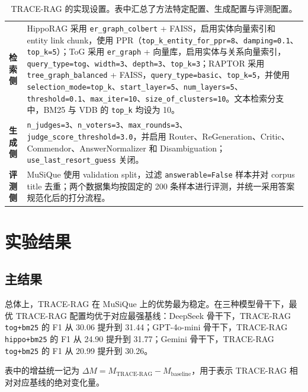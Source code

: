 ﻿\documentclass[UTF8,11pt,twocolumn]{ctexart}
\begin{document}
\begin{table}[t]
\centering
\small
\begin{tabularx}{\columnwidth}{@{}>{\raggedright\arraybackslash\bfseries}p{1.45cm}>{\raggedright\arraybackslash}X@{}}
\toprule
检索侧 & HippoRAG 采用 \texttt{er\_graph\_colbert} + FAISS，启用实体向量索引和 entity link chunk，使用 PPR（\texttt{top\_k\_entity\_for\_ppr=8}、\texttt{damping=0.1}、\texttt{top\_k=5}）；ToG 采用 \texttt{er\_graph} + 向量库，启用实体与关系向量索引，\texttt{query\_type=tog}、\texttt{width=3}、\texttt{depth=3}、\texttt{top\_k=3}；RAPTOR 采用 \texttt{tree\_graph\_balanced} + FAISS，\texttt{query\_type=basic}、\texttt{top\_k=5}，并使用 \texttt{selection\_mode=top\_k}、\texttt{start\_layer=5}、\texttt{num\_layers=5}、\texttt{threshold=0.1}、\texttt{max\_iter=10}、\texttt{size\_of\_clusters=10}。文本检索分支中，BM25 与 VDB 的 \texttt{top\_k} 均设为 10。 \\
生成侧 & \texttt{n\_judges=3}、\texttt{n\_voters=3}、\texttt{max\_rounds=3}、\texttt{judge\_score\_threshold=3.0}，并启用 Router、ReGeneration、Critic、Commendor、AnswerNormalizer 和 Disambiguation；\texttt{use\_last\_resort\_guess} 关闭。 \\
评测侧 & MuSiQue 使用 validation split，过滤 \texttt{answerable=False} 样本并对 corpus title 去重；两个数据集均按固定的 200 条样本进行评测，并统一采用答案规范化后的打分流程。 \\
\bottomrule
\end{tabularx}
\caption{TRACE-RAG 的实现设置。表中汇总了方法特定配置、生成配置与评测配置。}
\label{tab:implementation-settings}
\end{table}

\section{实验结果}

\subsection{主结果}

总体上，TRACE-RAG 在 MuSiQue 上的优势最为稳定。在三种模型骨干下，最优 TRACE-RAG 配置均优于对应最强基线：DeepSeek 骨干下，TRACE-RAG \texttt{tog+bm25} 的 F1 从 30.06 提升到 31.44；GPT-4o-mini 骨干下，TRACE-RAG \texttt{hippo+bm25} 的 F1 从 24.90 提升到 31.77；Gemini 骨干下，TRACE-RAG \texttt{tog+bm25} 的 F1 从 20.99 提升到 30.26。

表中的增益统一记为 $\Delta M = M_{\text{TRACE-RAG}} - M_{\text{baseline}}$，用于表示 TRACE-RAG 相对对应基线的绝对变化量。
\end{document}
